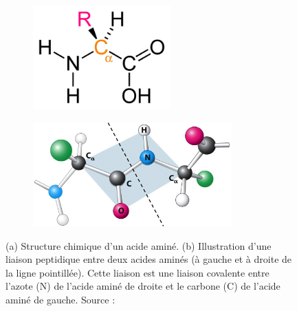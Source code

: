     \begin{figure}[H]
        \begin{subfigure}{.4\textwidth}
            \centering
            {\includegraphics[height=4cm]{./figures/ch1/amino_acid_structure}}
            \caption{}
            \label{Fig:amino_acid_structure}
        \end{subfigure}
        \begin{subfigure}{.6\textwidth}
            \centering
            {\includegraphics[height=4cm]{./figures/ch1/peptidic_bond.png}}
            \caption{}
            \label{Fig:peptide_bond}
        \end{subfigure}
        \caption{(a) Structure chimique d'un acide aminé. 
        (b) Illustration d'une liaison peptidique entre deux acides aminés (à gauche et à droite de la ligne pointillée). Cette liaison est une liaison covalente entre l'azote (N) de l'acide aminé de droite et le carbone (C) de l'acide aminé de gauche.  Source :~\cite{berg_biochemistry_2012}}
    \end{figure}
    

